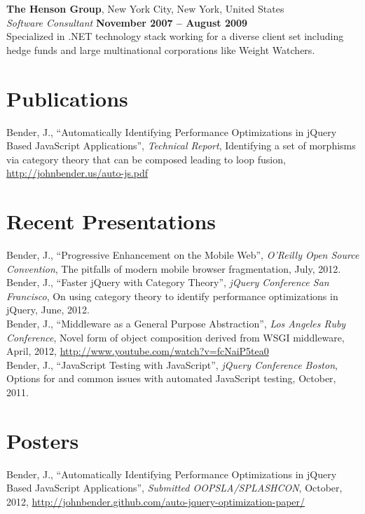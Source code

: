 \documentclass[margin,line]{resume}
\begin{document}
\begin{resume}
  \textbf{The Henson Group}, New York City, New York, United States \vspace{1mm}\\
  \textsl{Software Consultant} \hfill \textbf{November 2007 -- August 2009}\\
  Specialized in .NET technology stack working for a diverse client set including hedge funds and large multinational corporations like Weight Watchers.

  \section{\mysidestyle Publications}
  Bender, J., ``Automatically Identifying Performance Optimizations in jQuery Based JavaScript Applications'', \textsl{Technical Report}, Identifying a set of morphisms via category theory that can be composed leading to loop fusion, \url{http://johnbender.us/auto-js.pdf}

  \section{\mysidestyle Recent Presentations}
  Bender, J., ``Progressive Enhancement on the Mobile Web'', \textsl{O'Reilly Open Source Convention}, The pitfalls of modern mobile browser fragmentation, July, 2012.\vspace{2mm}\\
  Bender, J., ``Faster jQuery with Category Theory'', \textsl{jQuery Conference San Francisco}, On using category theory to identify performance optimizations in jQuery, June, 2012. \vspace{2mm}\\
  Bender, J., ``Middleware as a General Purpose Abstraction'', \textsl{Los Angeles Ruby Conference}, Novel form of object composition derived from WSGI middleware, April, 2012, \url{http://www.youtube.com/watch?v=fcNaiP5tea0} \vspace{2mm}\\
  Bender, J., ``JavaScript Testing with JavaScript'', \textsl{jQuery Conference Boston}, Options for and common issues with automated JavaScript testing, October, 2011.

  \section{\mysidestyle Posters}
  Bender, J., ``Automatically Identifying Performance Optimizations in jQuery Based JavaScript Applications'', \textsl{Submitted OOPSLA/SPLASHCON}, October, 2012, \url{http://johnbender.github.com/auto-jquery-optimization-paper/}



\end{resume}
\end{document}

